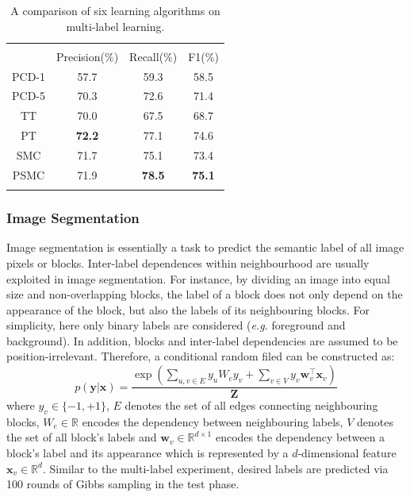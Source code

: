 \begin{table}
	\center
\begin{tabular}{cccc} 
\Xhline{2\arrayrulewidth} \\ 
       & Precision($\%$) & Recall($\%$) & F1($\%$) \\ \hline 
 PCD-1 & 57.7            & 59.3         & 58.5 \\
 PCD-5 & 70.3            & 72.6         & 71.4 \\
 TT    & 70.0            & 67.5         & 68.7 \\
 PT    & {\bf 72.2}      & 77.1         & 74.6 \\
SMC    & 71.7            & 75.1         & 73.4 \\
PSMC   & 71.9            & {\bf 78.5}   & {\bf 75.1} \\ 
\Xhline{2\arrayrulewidth}
 \end{tabular}
 \caption{A comparison of six learning algorithms on multi-label learning. }
	\label{tab:scene_results}
\end{table}

\subsubsection{Image Segmentation} 
Image segmentation is  essentially a task to predict the semantic label of all image pixels or blocks.    
Inter-label dependences within neighbourhood are usually exploited in image segmentation. For instance, by dividing an image into equal size and non-overlapping 
blocks, the label of a block does not only depend on the appearance of the block, but also the labels of its neighbouring blocks. For simplicity, here 
only binary labels are considered (\emph{e.g.} foreground and background). 
In addition, blocks and inter-label dependencies are assumed to be position-irrelevant. Therefore, a conditional random filed can 
be constructed as:               
\begin{equation}
	p(\mathbf{y}|\mathbf{x})=\frac{\exp(\sum_{u,v\in E}y_u W_e y_v+\sum_{v\in V} y_v \mathbf{w}_v^\top \mathbf{x}_v) }{\mathbf{Z}}
\end{equation}
where $y_v\in\{-1,+1\}$, $E$ denotes the set of all edges connecting neighbouring blocks, $W_e\in\mathbb{R}$ encodes the dependency between neighbouring labels, $V$ denotes the set of all 
block's labels and $\mathbf{w}_v\in \mathbb{R}^{d\times 1}$ encodes the dependency between a block's label and its appearance which is represented by a $d$-dimensional feature $\mathbf{x}_v\in\mathbb{R}^d$.    
Similar to the multi-label experiment, desired labels are predicted via 100 rounds of Gibbs sampling in the test phase.      

